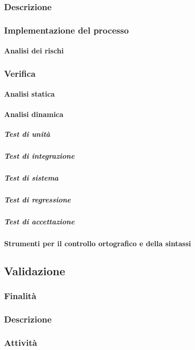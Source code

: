 \documentclass[../norme-di-progetto.tex]{subfiles}
\begin{document}
\subsubsection{Descrizione}
\subsubsection{Implementazione del processo}
\paragraph{Analisi dei rischi}
\subsubsection{Verifica}
\paragraph{Analisi statica}
\paragraph{Analisi dinamica}
\subparagraph{Test di unità}
\subparagraph{Test di integrazione}
\subparagraph{Test di sistema}
\subparagraph{Test di regressione}
\subparagraph{Test di accettazione}
\paragraph{Strumenti per il controllo ortografico e della sintassi}
\subsection{Validazione}
\subsubsection{Finalità}
\subsubsection{Descrizione}
\subsubsection{Attività}
\end{document}
